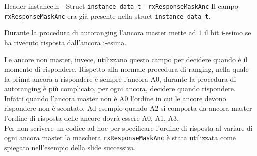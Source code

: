 \begin{frame}[shrink=10]{Header instance.h - Struct \lstinline[language=C]!instance_data_t! - \lstinline[language=C]!rxResponseMaskAnc!}
  Il campo \lstinline[language=C]!rxResponseMaskAnc! era già presente nella struct \lstinline[language=C]!instance_data_t!.
  \par
  Durante la procedura di autoranging l'ancora master mette ad $1$ il bit i-esimo se ha rivecuto risposta dall'ancora i-esima.
  \par
  Le ancore \alert{non} master, invece, utilizzano questo campo per decidere quando è il momento di rispondere.
  Rispetto alla normale procedura di ranging, nella quale la prima ancora a rispondere è sempre l'ancora A0, durante la
  procedura di autoranging è più complicato, per ogni ancora, decidere quando rispondere. Infatti quando l'ancora master non è A0
  l'ordine in cui le ancore devono rispondere non è scontato. Ad esempio quando A2 si comporta da ancora master l'ordine di risposta delle ancore
  dovrà essere A0, A1, A3.\\
  Per non scrivere un codice ad hoc per specificare l'ordine di risposta al variare di ogni ancora master la maschera \lstinline[language=C]!rxResponseMaskAnc!
  è stata utilizzata come spiegato nell'esempio della slide successiva.
\end{frame}

